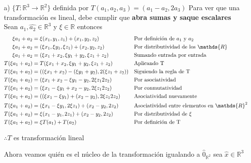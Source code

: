 \documentclass[letterpaper]{article}
\newcommand{\R}{\mathds{R}}
\renewcommand{\*}{\cdot}
\theoremstyle{definition}
\begin{document}
	a) $\lbrace T: \mathbb{R}^{3} \longrightarrow \mathbb{R}^{2} \rbrace $ definida por $T(a_{1},a_{2},a_{3}) = (a_{1} - a_{2}, 2a_{3})$
	Para ver que una transformación es lineal, debe cumplir que \textbf{abra sumas y saque escalares}\\
	Sean $ \hat{a_1}, \hat{a_2} \in \R^3 $ y $ \xi \in \R $ entonces
	\begin{align*}
		\xi a_1 + a_2 &= \xi(x_1,y_1,z_1) + (x_1, y_2,z_2) && \text{Por definición de $ a_1 $ y $ a_2 $}\\
		\xi a_1 + a_2 &= (\xi x_1,\xi y_1,\xi z_1) + (x_2, y_2,z_2)&& \text{Por distributividad de los $ \R $}\\
		\xi a_1 + a_2 &= (\xi x_1 +x_2,\xi y_1 + y_2,\xi z_1 + z_2)&& \text{Sumando entrada por entrada}\\
		T(\xi a_1 + a_2) &= T(\xi x_1 +x_2,\xi y_1 + y_2,\xi z_1 + z_2)&&\text{Aplicando T} \\
		T(\xi a_1 + a_2) &= ((\xi x_1 +x_2) -(\xi y_1 + y_2),2(\xi z_1 + z_2))&& \text{Siguiendo la regla de T} \\
		T(\xi a_1 + a_2) &= (\xi x_1 +x_2 -\xi y_1 - y_2,2\xi z_1  2z_2)&& \text{Por asociatividad}\\
		T(\xi a_1 + a_2) &= (\xi x_1 -\xi y_1 +x_2 - y_2,2\xi z_1  2z_2)&& \text{Por conmutatividad} \\
		T(\xi a_1 + a_2) &= ((\xi x_1 -\xi y_1) + (x_2 - y_2),2\xi z_1  2z_2)&& \text{Asociatividad nuevamente}\\
		T(\xi a_1 + a_2) &= (\xi x_1 -\xi y_1, 2\xi z_1) + (x_2 - y_2, 2z_2)&& \text{Asociatividad entre elementos en $ \R^2 $}\\
		T(\xi a_1 + a_2) &= \xi( x_1 - y_1, 2z_1) + (x_2 - y_2, 2z_2)&& \text{Por distributividad de $ \xi $} \\
		T(\xi a_1 + a_2) &= \xi T(a_1) + T(a_2) && \text{Por definición de T}
	\end{align*}
	\begin{center}
		$ \therefore T $ es transformación lineal
	\end{center}	
	
	Ahora veamos quién es el núcleo de la transformación igualando a $ \hat{0}_{\R^2} $  sea $ \hat{x} \in \R^3 $
	
\end{document}
